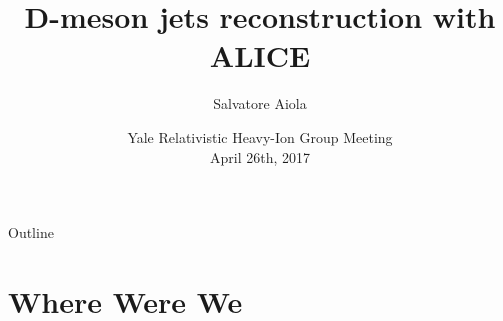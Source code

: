 \documentclass[xcolor={usenames,dvipsnames}]{beamer}
\title[D-meson jets reconstruction with ALICE] %
{D-meson jets reconstruction with ALICE}
\author[Salvatore Aiola]%
{Salvatore Aiola}
\institute[Yale University] %
{Yale University}
\date[Apr. 26th, 2017] %
{Yale Relativistic Heavy-Ion Group Meeting \\
April 26th, 2017}
\begin{document}
\begin{frame}
  \titlepage
\end{frame}

\begin{frame}{Outline}
   \tableofcontents
\end{frame}








\section{Where Were We}
\end{document}
